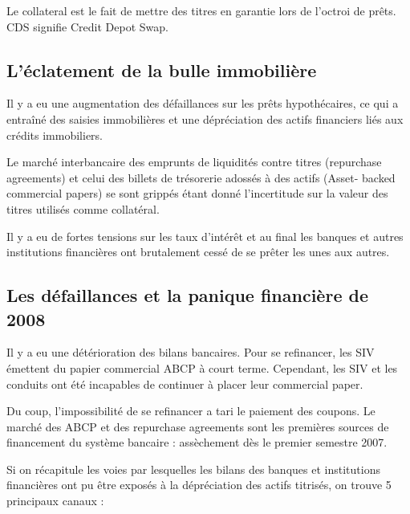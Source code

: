 	
	Le collateral est le fait de mettre des titres en garantie lors de l'octroi de prêts. CDS signifie Credit Depot Swap.
	
	\subsection{L'éclatement de la bulle immobilière}
	
	Il y a eu une augmentation des défaillances sur les prêts hypothécaires, ce qui a entraîné des saisies immobilières et une dépréciation des actifs financiers liés aux crédits immobiliers.
	
	Le marché interbancaire des emprunts de liquidités contre titres (repurchase agreements) et celui des billets de trésorerie adossés à des actifs (Asset- backed commercial papers) se sont grippés étant donné l'incertitude sur la valeur des titres utilisés comme collatéral. 

	Il y a eu de fortes tensions sur les taux d'intérêt et au final les banques et autres institutions financières ont brutalement cessé de se prêter les unes aux autres.
	
	\subsection{Les défaillances et la panique financière de 2008}
	
	Il y a eu une détérioration des bilans bancaires. Pour se refinancer, les SIV émettent du papier commercial ABCP à court terme. Cependant, les SIV et les conduits ont été incapables de continuer à placer leur commercial paper.

	Du coup, l'impossibilité de se refinancer a tari le paiement des coupons. Le marché des ABCP et des repurchase agreements sont les premières sources de financement du système bancaire : assèchement dès le premier semestre 2007.
	
	
	Si on récapitule les voies par lesquelles les bilans des banques et institutions financières ont pu être exposés à la dépréciation des actifs titrisés, on trouve 5 principaux canaux :

